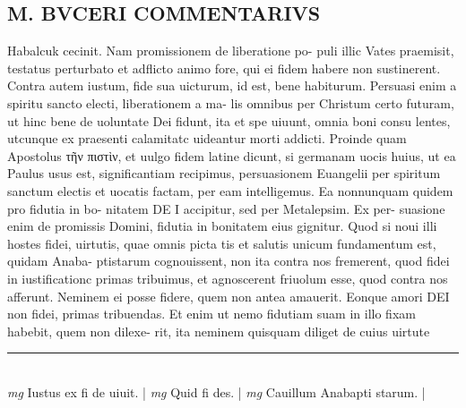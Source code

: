 \documentclass{article}
\begin{document}
\begin{pages}
\section*{M. BVCERI COMMENTARIVS }
\marginpar{[ p.20 ]}\pstart Habalcuk cecinit.  Nam promissionem de liberatione po- puli illic Vates praemisit, testatus perturbato et adflicto animo fore, qui ei fidem habere non sustinerent. Contra autem iustum, fide sua uicturum, id est, bene habiturum.  Persuasi enim a spiritu sancto electi, liberationem a ma- lis omnibus per Christum certo futuram, ut hinc bene de uoluntate Dei fidunt, ita et spe uiuunt, omnia boni consu lentes, utcunque ex praesenti calamitatc uideantur morti addicti.   \pend\pstart Proinde quam Apostolus τῆν πιστὶν, et uulgo fidem latine dicunt, si germanam uocis huius, ut ea Paulus usus est, significantiam recipimus, persuasionem Euangelii per spiritum sanctum electis et uocatis factam, per eam intelligemus. Ea nonnunquam quidem pro fidutia in bo- nitatem DE I accipitur, sed per Metalepsim.  Ex per- suasione enim de promissis Domini, fidutia in bonitatem eius gignitur.  \pend\pstart Quod si noui illi hostes fidei, uirtutis, quae omnis picta tis et salutis unicum fundamentum est, quidam Anaba- ptistarum cognouissent, non ita contra nos fremerent, quod  fidei in iustificationc primas tribuimus, et agnoscerent friuolum esse, quod contra nos afferunt.  Neminem ei posse fidere, quem non antea amauerit.  Eonque amori DEI non fidei, primas tribuendas.  Et enim ut nemo fidutiam suam in illo fixam habebit, quem non dilexe- rit, ita neminem quisquam diliget de cuius uirtute  \pend
\vspace{0.5cm}\noindent
\vspace{0.2cm}\rule{1cm}{0.2pt}\\ 
\hspace{0.2cm}\textit{mg}
\footnotesize Iustus ex fi de uiuit.  
\normalsize| 
\hspace{0.2cm}\textit{mg}
\footnotesize Quid fi des.  
\normalsize| 
\hspace{0.2cm}\textit{mg}
\footnotesize Cauillum Anabapti starum.  
\normalsize| 

\end{pages}
\end{document}
